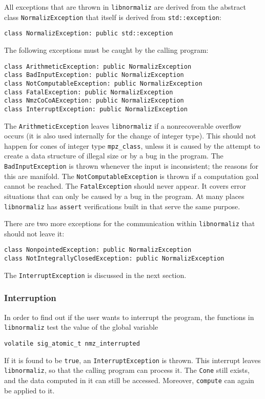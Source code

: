 \begin{small}
All exceptions that are thrown in \verb|libnormaliz| are derived from the abstract class \verb|NormalizException| that itself is derived from \verb|std::exception|:
\begin{Verbatim}
class NormalizException: public std::exception
\end{Verbatim}

The following exceptions must be caught by the calling program:
\begin{Verbatim}
class ArithmeticException: public NormalizException
class BadInputException: public NormalizException
class NotComputableException: public NormalizException
class FatalException: public NormalizException
class NmzCoCoAException: public NormalizException
class InterruptException: public NormalizException
\end{Verbatim}

The \verb|ArithmeticException| leaves \verb|libnormaliz| if a nonrecoverable overflow occurs (it is also used internally for the change of integer type). This should not happen for cones of integer type \verb|mpz_class|, unless it is caused by the attempt to create a data structure of illegal size or by a bug in the program. The \verb|BadInputException| is thrown whenever the input is inconsistent; the reasons for this are manifold. The \verb|NotComputableException| is thrown if a computation goal cannot be reached. The \verb|FatalException| should never appear. It covers error situations that can only be caused by a bug in the program. At many places \verb|libnormaliz| has \verb|assert| verifications built in that serve the same purpose.

There are two more exceptions for the communication within \verb|libnormaliz| that should not leave it:
\begin{Verbatim}
class NonpointedException: public NormalizException 
class NotIntegrallyClosedException: public NormalizException
\end{Verbatim}

The \verb|InterruptException| is discussed in the next section.

\subsubsection{Interruption}

In order to find out if the user wants to interrupt the program, the functions in \verb|libnormaliz| test the value of the global variable
\begin{Verbatim}
volatile sig_atomic_t nmz_interrupted
\end{Verbatim}
If it is found to be \verb|true|, an \verb|InterruptException| is thrown. This interrupt leaves \verb|libnormaliz|, so that the calling program can process it. The \verb|Cone| still exists, and the data computed in it can still be accessed. Moreover, \verb|compute| can again be applied to it.


\end{small}
